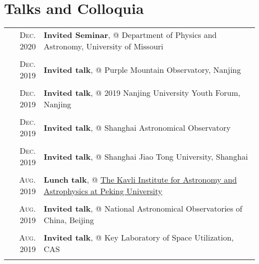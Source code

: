 \documentclass[letterpaper,10pt]{article}
\newcommand{\textwrap}{5.8in}       %
\begin{document}
\vspace*{-.7em}
\section{Talks and Colloquia}

\begingroup
\renewcommand\arraystretch{0.3}
\vspace*{-.5em}
\begin{longtable}{r|p{\textwrap}}

    \textsc{Dec. 2020}   &   \textbf{Invited Seminar}, @ Department of Physics and Astronomy, University of Missouri \\
    \multicolumn{2}{c}{} \\

    \textsc{Dec. 2019}   &   \textbf{Invited talk}, @ Purple Mountain Observatory, Nanjing \\
    \multicolumn{2}{c}{} \\

    \textsc{Dec. 2019}   &   \textbf{Invited talk}, @ 2019 Nanjing University Youth Forum, Nanjing \\
    \multicolumn{2}{c}{} \\

    \textsc{Dec. 2019}   &   \textbf{Invited talk}, @ Shanghai Astronomical Observatory \\
    \multicolumn{2}{c}{} \\

    \textsc{Dec. 2019}   &   \textbf{Invited talk}, @ Shanghai Jiao Tong University, Shanghai \\
    \multicolumn{2}{c}{} \\

    \textsc{Aug. 2019}   &   \textbf{Lunch talk}, @ \href{http://kiaa.pku.edu.cn/info/1025/5076.htm}{The Kavli Institute for 
    Astronomy and Astrophysics at Peking University} \\
    \multicolumn{2}{c}{} \\

    \textsc{Aug. 2019}   &   \textbf{Invited talk}, @ National Astronomical Observatories of China, Beijing \\
    \multicolumn{2}{c}{} \\

    \textsc{Aug. 2019}   &   \textbf{Invited talk}, @ Key Laboratory of Space Utilization, CAS \\
    \multicolumn{2}{c}{} \\


\end{longtable}
\end{document}
